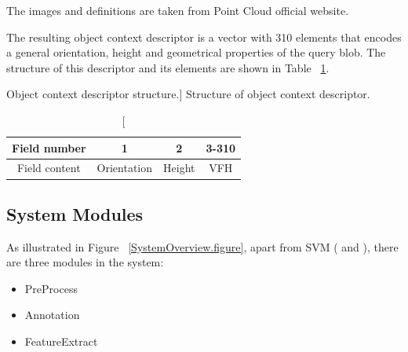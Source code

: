 The images and definitions are taken from Point Cloud official website.

The resulting object context descriptor is a vector with 310 elements that encodes a general orientation, height and
geometrical properties of the query blob.
The structure of this descriptor and its elements are shown in Table ~\ref{Descriptor.table}.

\begin{table}
\centering
\caption
[Object context descriptor structure.]
{Structure of object context descriptor.}
\label{Descriptor.table}
\begin{tabular}{|c|c|c|c|}
\hline
Field number & 1 & 2 & 3-310 \\
\hline
      Field content & Orientation & Height & VFH \\
\hline
\end{tabular}
\end{table}

% 
% 


\subsection{System Modules}
As illustrated in Figure ~\ref{SystemOverview.figure}, apart from SVM (\cite{LIBSVM} and 
\cite{li2010holistic}), there are three modules in the system:

\begin{itemize}
  \item PreProcess
  \item Annotation
  \item FeatureExtract
\end{itemize}

